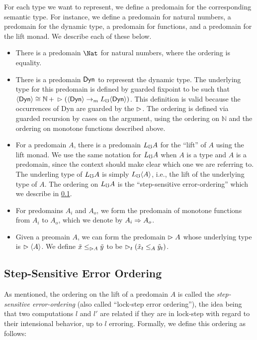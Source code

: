 For each type we want to represent, we define a predomain for the corresponding semantic
type. For instance, we define a predomain for natural numbers, a predomain for the
dynamic type, a predomain for functions, and a predomain for the lift monad. We
describe each of these below.

\begin{itemize}
  \item There is a predomain $\Nat$ for natural numbers, where the ordering is equality.
  
  \item There is a predomain $\mathsf{Dyn}$ to represent the dynamic type. The underlying type
  for this predomain is defined by guarded fixpoint to be such that
  $\langle {\mathsf{Dyn}} \rangle \cong \mathbb{N}\, +\, \vartriangleright (\langle {\mathsf{Dyn}} \rangle \to_m L_\mho \langle {\mathsf{Dyn}} \rangle)$.
  This definition is valid because the occurrences of Dyn are guarded by the $\vartriangleright$.
  The ordering is defined via guarded recursion by cases on the argument, using the
  ordering on $\mathbb{N}$ and the ordering on monotone functions described above.

  \item For a predomain $A$, there is a predomain $L_\mho A$ for the ``lift'' of $A$
  using the lift monad. We use the same notation for $L_\mho A$ when $A$ is a type
  and $A$ is a predomain, since the context should make clear which one we are referring to.
  The underling type of $L_\mho A$ is simply $L_\mho \langle {A} \rangle$, i.e., the lift of the underlying
  type of $A$.
  The ordering on $L_\mho A$ is the ``step-sensitive error-ordering'' which we describe in
  \ref{subsec:lock-step}.

  \item For predomains $A_i$ and $A_o$, we form the predomain of monotone functions
  from $A_i$ to $A_o$, which we denote by $A_i \Rightarrow A_o$.

  \item Given a preomain $A$, we can form the predomain $\vartriangleright A$ whose underlying
  type is $\vartriangleright \langle {A} \rangle$. We define $\tilde{x} \le_{\vartriangleright A} \tilde{y}$ to be
  $\vartriangleright_t (\tilde{x}_t \le_A \tilde{y}_t)$.
\end{itemize}



\subsection{Step-Sensitive Error Ordering}\label{subsec:lock-step}

As mentioned, the ordering on the lift of a predomain $A$ is called the
\emph{step-sensitive error-ordering} (also called ``lock-step error ordering''),
the idea being that two computations $l$ and $l'$ are related if they are in
lock-step with regard to their intensional behavior, up to $l$ erroring.
Formally, we define this ordering as follows:

